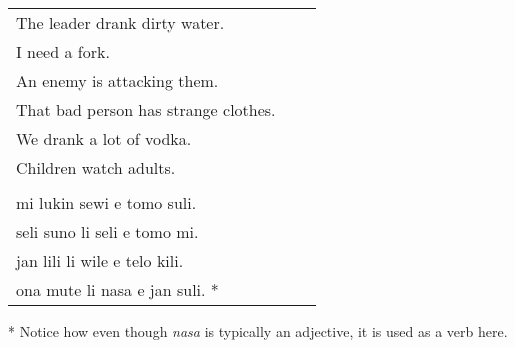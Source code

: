 \begin{supertabular}{p{5,5cm}|ll}
The leader drank dirty water. &&   \\ %
I need a fork.   &&   \\ %
An enemy is attacking them.   &&   \\ %
That bad person has strange clothes.   &&  \\  %
We drank a lot of vodka.   &&   \\ %
Children watch adults.   &&   \\ %
 && \\ %
mi lukin sewi e tomo suli.  &&    \\ %
seli suno li seli e tomo mi.  &&   \\ %
jan lili li wile e telo kili.  &&  \\ %
ona mute li nasa e jan suli. * &&  \\ %
\end{supertabular} 

* Notice how even though \textit{nasa} is typically an adjective, it is used as a verb here. 
